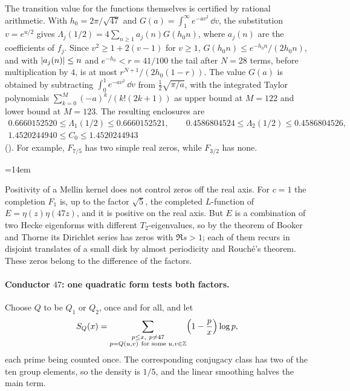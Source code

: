 The transition value for the functions themselves is certified by rational arithmetic. With
$h_0=2\pi/\sqrt{47}$ and $G(a)=\int_1^\infty e^{-av^2}\,\dd v$, the substitution $v=e^{u/2}$ gives
$\Lambda_j(1/2)=4\sum_{n\ge1}a_j(n)G(h_0n)$, where $a_j(n)$ are the coefficients of $f_j$. Since
$v^2\ge1+2(v-1)$ for $v\ge1$, $G(h_0n)\le e^{-h_0n}/(2h_0n)$, and with $\lvert a_j(n)\rvert\le n$ and
$e^{-h_0}<r=41/100$ the tail after $N=28$ terms, before multiplication by $4$, is at most
$r^{N+1}/(2h_0(1-r))$. The value $G(a)$ is obtained by subtracting $\int_0^1e^{-av^2}\,\dd v$ from
$\tfrac12\sqrt{\pi/a}$, with the integrated Taylor polynomials $\sum_{k=0}^{M}(-a)^k/(k!(2k+1))$ as upper
bound at $M=122$ and lower bound at $M=123$. The resulting enclosures are
\begin{equation}\label{hec:eq:C0}
\begin{gathered}
 0.6660152520\le\Lambda_1(1/2)\le0.6660152521,\qquad
 0.4586804524\le\Lambda_2(1/2)\le0.4586804526,\\
 1.4520244940\le C_0\le1.4520244943
\end{gathered}
\end{equation}
(). For example, $F_{7/5}$ has two simple real zeros,
while $F_{3/2}$ has none.
{\emergencystretch=14em\par}

\begin{remark}\label{hec:rem:bookerthorne}
Positivity of a Mellin kernel does not control zeros off the real axis. For $c=1$ the completion $F_1$ is,
up to the factor $\sqrt5$, the completed $L$-function of $E=\eta(z)\eta(47z)$, and it is positive on the
real axis. But $E$ is a combination of two Hecke eigenforms with different $T_2$-eigenvalues, so by the
theorem of Booker and Thorne \cite[Theorem~1.1]{BookerThorne2014Zeros} its Dirichlet series has zeros with
$\Re s>1$; each of them recurs in disjoint translates of a small disk by almost periodicity and Rouch\'e's
theorem. These zeros belong to the difference of the factors.
\end{remark}

\paragraph{Conductor $47$: one quadratic form tests both factors.}
Choose $Q$ to be $Q_1$ or $Q_2$, once and for all, and let
\[
 S_Q(x)=\sum_{\substack{p\le x,\ p\ne47\\ p=Q(u,v)\ \text{for some }u,v\in\mathbb{Z}}}\Bigl(1-\frac px\Bigr)\log p,
\]
each prime being counted once. The corresponding conjugacy class has two of the ten group elements, so the
density is $1/5$, and the linear smoothing halves the main term.


